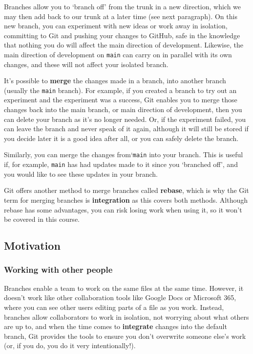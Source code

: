 \documentclass[
  letterpaper,
  DIV=11,
  numbers=noendperiod]{scrartcl}
\begin{document}
Branches allow you to `branch off' from the trunk in a new direction,
which we may then add back to our trunk at a later time (see next
paragraph). On this new branch, you can experiment with new ideas or
work away in isolation, committing to Git and pushing your changes to
GitHub, safe in the knowledge that nothing you do will affect the main
direction of development. Likewise, the main direction of development on
\texttt{main} can carry on in parallel with its own changes, and these
will not affect your isolated branch.

It's possible to \textbf{merge} the changes made in a branch, into
another branch (usually the \texttt{main} branch). For example, if you
created a branch to try out an experiment and the experiment was a
success, Git enables you to merge those changes back into the main
branch, or main direction of development, then you can delete your
branch as it's no longer needed. Or, if the experiment failed, you can
leave the branch and never speak of it again, although it will still be
stored if you decide later it is a good idea after all, or you can
safely delete the branch.

Similarly, you can merge the changes from`\texttt{main} into your
branch. This is useful if, for example, \texttt{main} has had updates
made to it since you `branched off', and you would like to see these
updates in your branch.

Git offers another method to merge branches called \textbf{rebase},
which is why the Git term for merging branches is \textbf{integration}
as this covers both methods. Although rebase has some advantages, you
can risk losing work when using it, so it won't be covered in this
course.

\hypertarget{motivation}{%
\subsection{Motivation}\label{motivation}}

\hypertarget{working-with-other-people}{%
\subsubsection{Working with other
people}\label{working-with-other-people}}

Branches enable a team to work on the same files at the same time.
However, it doesn't work like other collaboration tools like Google Docs
or Microsoft 365, where you can see other users editing parts of a file
as you work. Instead, branches allow collaborators to work in isolation,
not worrying about what others are up to, and when the time comes to
\textbf{integrate} changes into the default branch, Git provides the
tools to ensure you don't overwrite someone else's work (or, if you do,
you do it very intentionally!).
\end{document}
